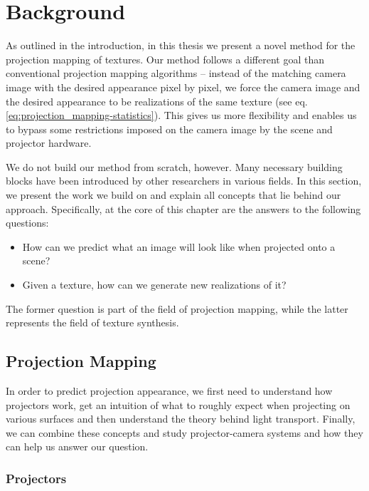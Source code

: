 \chapter{Background}
\label{chapter:background} 

As outlined in the introduction, in this thesis we present a novel method for the projection mapping of textures. Our method follows a different goal than conventional projection mapping algorithms -- instead of the matching camera image with the desired appearance pixel by pixel, we force the camera image and the desired appearance to be realizations of the same texture (see eq. \ref{eq:projection_mapping-statistics}). This gives us more flexibility and enables us to bypass some restrictions imposed on the camera image by the scene and projector hardware.

We do not build our method from scratch, however. Many necessary building blocks have been introduced by other researchers in various fields. In this section, we present the work we build on and explain all concepts that lie behind our approach. Specifically, at the core of this chapter are the answers to the following questions:

\begin{itemize}
    \item How can we predict what an image will look like when projected onto a scene?
    \item Given a texture, how can we generate new realizations of it?
\end{itemize}

The former question is part of the field of projection mapping, while the latter represents the field of texture synthesis.

\section{Projection Mapping}
\label{section:background-projection_mapping}

In order to predict projection appearance, we first need to understand how projectors work, get an intuition of what to roughly expect when projecting on various surfaces and then understand the theory behind light transport. Finally, we can combine these concepts and study projector-camera systems and how they can help us answer our question.

\subsection{Projectors}
\label{section:background-projection_mapping-projectors}

